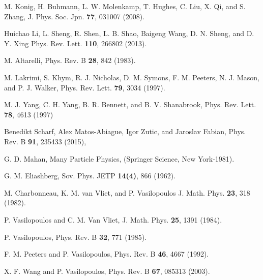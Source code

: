 \documentclass[prb,twocolumn]{revtex4-1}
\begin{document}
\begin{thebibliography}{55}
M. Konig, H. Buhmann, L. W. Molenkamp, T. Hughes, C. Liu, X. Qi, and S. Zhang,
	J. Phys. Soc. Jpn. \textbf{77}, 031007 (2008).

Huichao Li, L. Sheng, R. Shen, L. B. Shao, Baigeng Wang, D. N. Sheng, and D. Y. Xing
Phys. Rev. Lett. \textbf{110}, 266802 (2013).

M. Altarelli, 
Phys. Rev. B \textbf{28}, 842 (1983).

M. Lakrimi, S. Khym, R. J. Nicholas, D. M. Symons, F. M.
Peeters, N. J. Mason, and P. J. Walker, Phys. Rev. Lett. \textbf{79}, 3034 (1997).

M. J. Yang, C. H. Yang, B. R. Bennett, and B. V. Shanabrook,
Phys. Rev. Lett. \textbf{78}, 4613 (1997)

Benedikt Scharf, Alex Matos-Abiague, Igor Zutic, and Jaroslav Fabian, Phys. Rev. B \textbf{91}, 235433 (2015),  


G. D. Mahan, Many Particle Physics, (Springer Science,
New York-1981).

G. M. Eliashberg,
Sov. Phys. JETP {\bf 14(4)}, 866 (1962).

M. Charbonneau, K. M. van Vliet, and P. Vasilopoulos 
J. Math. Phys. {\bf 23}, 318 (1982).

P. Vasilopoulos and C. M. Van Vliet, 
J. Math. Phys. {\bf 25}, 1391 (1984).


P. Vasilopoulos,
Phys. Rev. B {\bf 32}, 771 (1985).

F. M. Peeters and P. Vasilopoulos,
Phys. Rev. B {\bf 46}, 4667 (1992).



X. F. Wang and P. Vasilopoulos,
Phys. Rev. B {\bf 67}, 085313 (2003).
\end{thebibliography}
\end{document}

